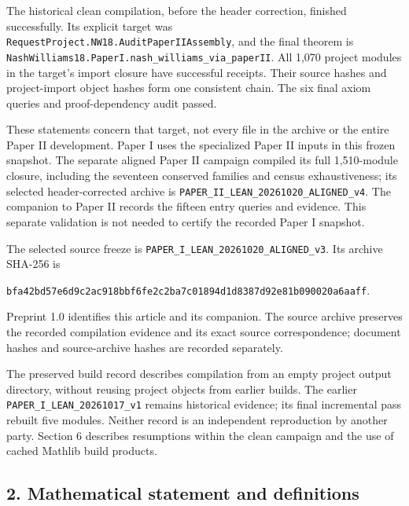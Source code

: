 \documentclass[english,11pt,a4paper]{article}
\begin{document}
The historical clean compilation, before the header correction, finished successfully. Its explicit target was \texttt{Request\allowbreak{}Project.\allowbreak{}NW18.\allowbreak{}Audit\allowbreak{}Paper\allowbreak{}IIAssembly}, and the final theorem is \texttt{Nash\allowbreak{}Williams18.\allowbreak{}Paper\allowbreak{}I.\allowbreak{}nash\_\allowbreak{}williams\_\allowbreak{}via\_\allowbreak{}paper\allowbreak{}II}. All 1,070 project modules in the target's import closure have successful receipts. Their source hashes and project-import object hashes form one consistent chain. The six final axiom queries and proof-dependency audit passed.

These statements concern that target, not every file in the archive or the entire Paper II development. Paper I uses the specialized Paper II inputs in this frozen snapshot. The separate aligned Paper II campaign compiled its full 1,510-module closure, including the seventeen conserved families and census exhaustiveness; its selected header-corrected archive is \texttt{PAPER\_\allowbreak{}II\_\allowbreak{}LEAN\_\allowbreak{}20261020\_\allowbreak{}ALIGNED\_\allowbreak{}v4}. The companion to Paper II records the fifteen entry queries and evidence. This separate validation is not needed to certify the recorded Paper I snapshot.

The selected source freeze is \texttt{PAPER\_\allowbreak{}I\_\allowbreak{}LEAN\_\allowbreak{}20261020\_\allowbreak{}ALIGNED\_\allowbreak{}v3}. Its archive SHA-256 is

\texttt{bfa42bd5\allowbreak{}7e6d9c2a\allowbreak{}c918bbf6\allowbreak{}fe2c2ba7\allowbreak{}c01894d1\allowbreak{}d8387d92\allowbreak{}e81b0900\allowbreak{}20a6aaff}.

Preprint 1.0 identifies this article and its companion. The source archive preserves the recorded compilation evidence and its exact source correspondence; document hashes and source-archive hashes are recorded separately.

The preserved build record describes compilation from an empty project output directory, without reusing project objects from earlier builds. The earlier \texttt{PAPER\_\allowbreak{}I\_\allowbreak{}LEAN\_\allowbreak{}20261017\_\allowbreak{}v1} remains historical evidence; its final incremental pass rebuilt five modules. Neither record is an independent reproduction by another party. Section 6 describes resumptions within the clean campaign and the use of cached Mathlib build products.


\subsection{2. Mathematical statement and definitions}\label{mathematical-statement-and-definitions}
\end{document}
